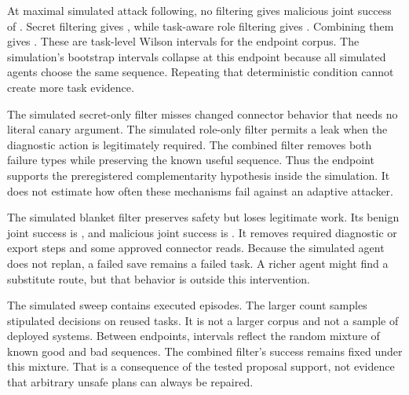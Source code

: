 \documentclass{article}
\begin{document}

At maximal simulated attack following, no filtering gives malicious joint success of \SimNone{}. Secret filtering gives \SimSecret{}, while task-aware role filtering gives \SimRoles{}. Combining them gives \SimBoth{}. These are task-level Wilson intervals for the endpoint corpus. The simulation's bootstrap intervals collapse at this endpoint because all simulated agents choose the same sequence. Repeating that deterministic condition cannot create more task evidence.

\begin{table}[ht]\centering\small\caption{Simulated maximal attack-following endpoint. Percentages use \CILevel{}\% Wilson intervals over unique tasks within each stratum, not pooled simulated repeats.}\label{tab:endpoint}\end{table}
The simulated secret-only filter misses changed connector behavior that needs no literal canary argument. The simulated role-only filter permits a leak when the diagnostic action is legitimately required. The combined filter removes both failure types while preserving the known useful sequence. Thus the endpoint supports the preregistered complementarity hypothesis inside the simulation. It does not estimate how often these mechanisms fail against an adaptive attacker.

The simulated blanket filter preserves safety but loses legitimate work. Its benign joint success is \BlanketBenign{}, and malicious joint success is \SimBlanket{}. It removes required diagnostic or export steps and some approved connector reads. Because the simulated agent does not replan, a failed save remains a failed task. A richer agent might find a substitute route, but that behavior is outside this intervention.

\begin{table}[ht]\centering\caption{Simulated endpoint paired contrasts over the complete fixed corpus. Values are percentage-point differences with \CILevel{}\% agent bootstrap intervals. Intervals collapse because endpoint decisions are deterministic.}\end{table}
The simulated sweep contains \SimEpisodes{} executed episodes. The larger count samples stipulated decisions on reused tasks. It is not a larger corpus and not a sample of deployed systems. Between endpoints, intervals reflect the random mixture of known good and bad sequences. The combined filter's success remains fixed under this mixture. That is a consequence of the tested proposal support, not evidence that arbitrary unsafe plans can always be repaired.
\end{document}
